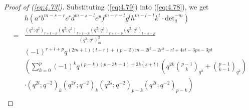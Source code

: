 \documentclass[10pt,a4paper]{amsart}
\begin{document}
\begin{proof}[Proof of (\ref{eq:4.73})]
    Substituting (\ref{eq:4.79}) into (\ref{eq:4.78}), we get
    \begin{equation}
        \begin{split}
            &h\left(a^sb^{m-s-r}c^rd^{m-s-l}e^{p}f^{m-r-t}g^lh^{m-l-t}k^t\cdot\text{det}_q^{-m}\right)\\
            =&\frac{(q^2;q^2)_{r+t-p}(q^2;q^2)_{l+t-p}(q^2;q^2)_{r+s-p}(q^2;q^2)_{l+s-p}}{(q^2;q^2)_m^2}\\
            &(-1)^{r+l+p}q^{(2m+1)(l+r)+(p-2)m-2l^2-2r^2-rl+4st-3ps-3pt}\\
            &\left(\sum_{k=0}^{p}(-1)^{k}q^{(p-k)(p-3k-1)+2k(s+t)}\left(q^{2k}{p-1\choose k}_{q^{2}}+{p-1\choose k-1}_{q^{2}}\right)\right.\\
            &\left.\cdot(q^{2l};q^{-2})_k(q^{2r};q^{-2})_k(q^{2s};q^{-2})_{p-k}(q^{2t};q^{-2})_{p-k}\right)\\

\end{split}
\end{equation}
\end{proof}
\end{document}
